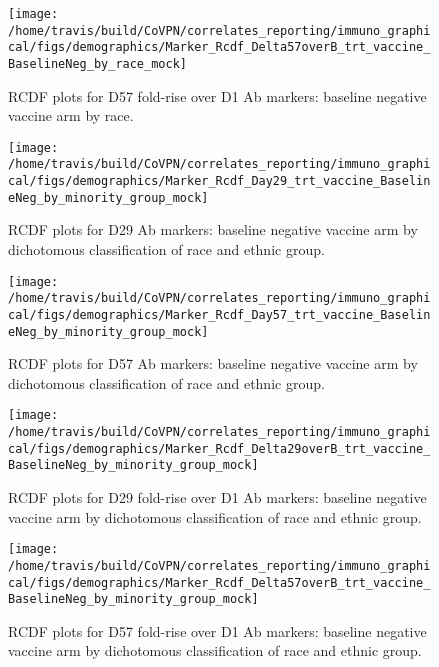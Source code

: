 \documentclass[]{book}
\theoremstyle{definition}
\theoremstyle{definition}
\theoremstyle{definition}
\newcommand{\1}{\mathbbm{1}}
\begin{document}
\clearpage
\begin{figure}[H]

{\centering \texttt{[image: /home/travis/build/CoVPN/correlates\_reporting/immuno\_graphical/figs/demographics/Marker\_Rcdf\_Delta57overB\_trt\_vaccine\_BaselineNeg\_by\_race\_mock]} 

}

\caption{RCDF plots for D57 fold-rise over D1 Ab markers: baseline negative vaccine arm by race.}\label{fig:unnamed-chunk-83}
\end{figure}

\clearpage
\begin{figure}[H]

{\centering \texttt{[image: /home/travis/build/CoVPN/correlates\_reporting/immuno\_graphical/figs/demographics/Marker\_Rcdf\_Day29\_trt\_vaccine\_BaselineNeg\_by\_minority\_group\_mock]} 

}

\caption{RCDF plots for D29 Ab markers: baseline negative vaccine arm by dichotomous classification of race and ethnic group.}\label{fig:unnamed-chunk-84}
\end{figure}

\clearpage
\begin{figure}[H]

{\centering \texttt{[image: /home/travis/build/CoVPN/correlates\_reporting/immuno\_graphical/figs/demographics/Marker\_Rcdf\_Day57\_trt\_vaccine\_BaselineNeg\_by\_minority\_group\_mock]} 

}

\caption{RCDF plots for D57 Ab markers: baseline negative vaccine arm by dichotomous classification of race and ethnic group.}\label{fig:unnamed-chunk-85}
\end{figure}

\clearpage
\begin{figure}[H]

{\centering \texttt{[image: /home/travis/build/CoVPN/correlates\_reporting/immuno\_graphical/figs/demographics/Marker\_Rcdf\_Delta29overB\_trt\_vaccine\_BaselineNeg\_by\_minority\_group\_mock]} 

}

\caption{RCDF plots for D29 fold-rise over D1 Ab markers: baseline negative vaccine arm by dichotomous classification of race and ethnic group.}\label{fig:unnamed-chunk-86}
\end{figure}

\clearpage
\begin{figure}[H]

{\centering \texttt{[image: /home/travis/build/CoVPN/correlates\_reporting/immuno\_graphical/figs/demographics/Marker\_Rcdf\_Delta57overB\_trt\_vaccine\_BaselineNeg\_by\_minority\_group\_mock]} 

}

\caption{RCDF plots for D57 fold-rise over D1 Ab markers: baseline negative vaccine arm by dichotomous classification of race and ethnic group.}\label{fig:unnamed-chunk-87}
\end{figure}
\end{document}
